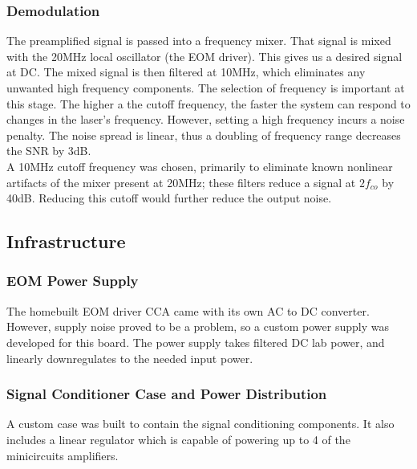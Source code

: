     \subsubsection{Demodulation}

The preamplified signal is passed into a frequency mixer.  That signal is mixed with the 20MHz local oscillator (the EOM driver).  This gives us a desired signal at DC.  The mixed signal is then filtered at 10MHz, which eliminates any unwanted high frequency components.  The selection of frequency is important at this stage.  The higher a the cutoff frequency, the faster the system can respond to changes in the laser's frequency. However, setting a high frequency incurs a noise penalty.  The noise spread is linear, thus a doubling of frequency range decreases the SNR by 3dB. \\

A 10MHz cutoff frequency was chosen, primarily to eliminate known nonlinear artifacts of the mixer present at 20MHz; these filters reduce a signal at $2f_{co}$ by 40dB\cite{zfl_1000}.  Reducing this cutoff would further reduce the output noise. \\

\subsection{Infrastructure}
    \subsubsection{EOM Power Supply}

The homebuilt EOM driver CCA came with its own AC to DC converter.  However, supply noise proved to be a problem, so a custom power supply was developed for this board.  The power supply takes filtered DC lab power, and linearly downregulates to the needed input power. \\

    \subsubsection{Signal Conditioner Case and Power Distribution}

A custom case was built to contain the signal conditioning components.  It also includes a linear regulator which is capable of powering up to 4 of the minicircuits amplifiers.


